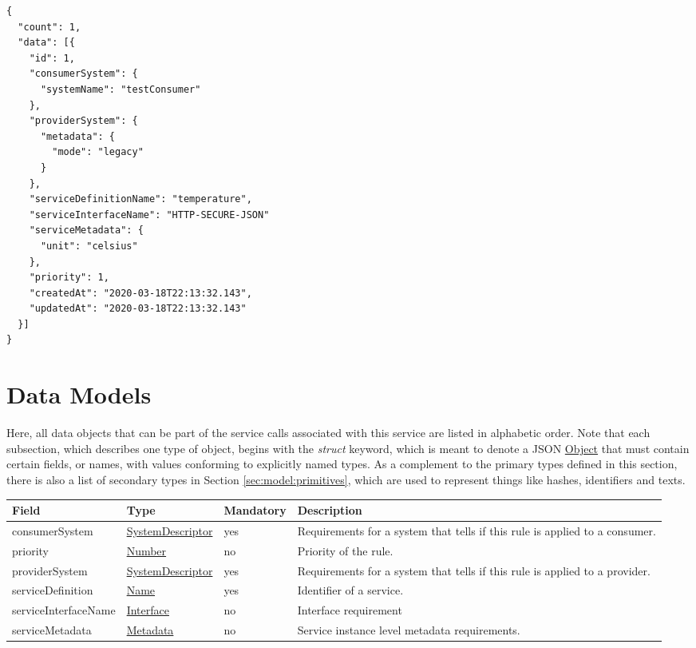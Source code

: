 \documentclass[a4paper]{arrowhead}
\newcommand{\fref}[1]{{\textcolor{ArrowheadBlue}{\hyperref[sec:functions:#1]{#1}}}}
\newcommand{\pref}[1]{{\textcolor{ArrowheadGrey}{\hyperref[sec:model:primitives:#1]{#1}}}}
\begin{document}
\begin{lstlisting}[language=http,label={lst:orchestration-create-flexible-store-rules_response},caption={An \fref{orchestration-create-flexible-store-rules} response.}]
{
  "count": 1,
  "data": [{
    "id": 1,
    "consumerSystem": {
      "systemName": "testConsumer"
    },
    "providerSystem": {
      "metadata": {
        "mode": "legacy"
      }
    },
    "serviceDefinitionName": "temperature",
    "serviceInterfaceName": "HTTP-SECURE-JSON"
    "serviceMetadata": {
      "unit": "celsius"
    },
    "priority": 1,
    "createdAt": "2020-03-18T22:13:32.143",
    "updatedAt": "2020-03-18T22:13:32.143"
  }]
}
\end{lstlisting}

\newpage

\section{Data Models}
\label{sec:model}

Here, all data objects that can be part of the service calls associated with this service are listed in alphabetic order.
Note that each subsection, which describes one type of object, begins with the \textit{struct} keyword, which is meant to denote a JSON \pref{Object} that must contain certain fields, or names, with values conforming to explicitly named types.
As a complement to the primary types defined in this section, there is also a list of secondary types in Section \ref{sec:model:primitives}, which are used to represent things like hashes, identifiers and texts.

\label{sec:model:FlexibleRule}
 
\begin{table}[ht!]
\begin{tabularx}{\textwidth}{| p{3.5cm} | p{3cm} | p{2cm} | X |} \hline
\rowcolor{gray!33} Field & Type & Mandatory & Description \\ \hline
consumerSystem & \hyperref[sec:model:SystemDescriptor]{SystemDescriptor} & yes & Requirements for a system that tells if this rule is applied to a consumer. \\ \hline
priority & \pref{Number} & no & Priority of the rule. \\ \hline
providerSystem & \hyperref[sec:model:SystemDescriptor]{SystemDescriptor} & yes & Requirements for a system that tells if this rule is applied to a provider. \\ \hline
serviceDefinition & \pref{Name} & yes & Identifier of a service. \\ \hline
serviceInterfaceName & \pref{Interface} & no & Interface requirement \\ \hline
serviceMetadata & \hyperref[sec:model:Metadata]{Metadata} & no & Service instance level metadata requirements. \\ \hline

\end{tabularx}
\end{table}
\end{document}
